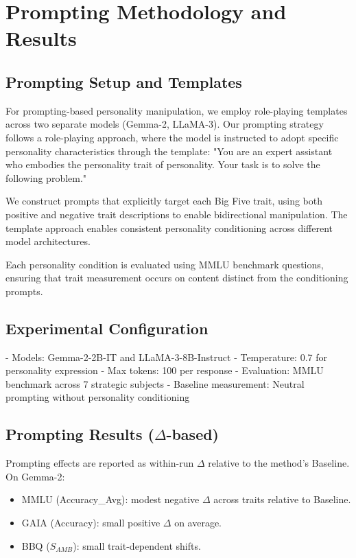 \section{Prompting Methodology and Results}
\label{app:prompting}

\subsection{Prompting Setup and Templates}

For prompting-based personality manipulation, we employ role-playing templates across two separate models (Gemma-2, LLaMA-3). Our prompting strategy follows a role-playing approach, where the model is instructed to adopt specific personality characteristics through the template: "You are an expert assistant who embodies the personality trait of {personality}. Your task is to solve the following problem."

We construct prompts that explicitly target each Big Five trait, using both positive and negative trait descriptions to enable bidirectional manipulation. The template approach enables consistent personality conditioning across different model architectures.

Each personality condition is evaluated using MMLU benchmark questions, ensuring that trait measurement occurs on content distinct from the conditioning prompts.

\subsection{Experimental Configuration}

- Models: Gemma-2-2B-IT and LLaMA-3-8B-Instruct
- Temperature: 0.7 for personality expression
- Max tokens: 100 per response
- Evaluation: MMLU benchmark across 7 strategic subjects
- Baseline measurement: Neutral prompting without personality conditioning

\subsection{Prompting Results (\(\Delta\)-based)}

Prompting effects are reported as within-run \(\Delta\) relative to the method's Baseline. On Gemma-2:
\begin{itemize}
\item MMLU (Accuracy\_Avg): modest negative \(\Delta\) across traits relative to Baseline.
\item GAIA (Accuracy): small positive \(\Delta\) on average.
\item BBQ (\(S_{AMB}\)): small trait-dependent shifts.
\end{itemize}

